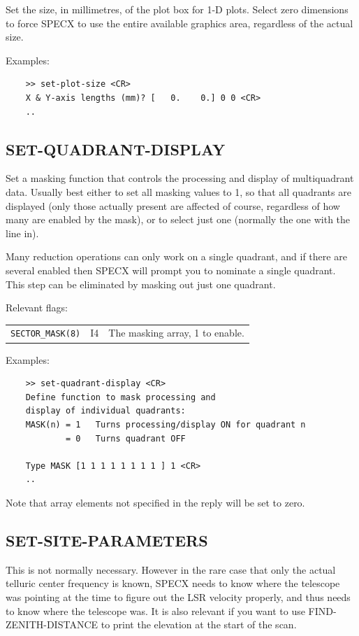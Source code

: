 \documentclass[11pt,twoside]{report}
\begin{document}
Set the size, in millimetres, of the plot box for 1-D plots. Select
zero dimensions to force SPECX to use the entire available graphics area,
regardless of the actual size.

Examples:
\begin{verbatim}
    >> set-plot-size <CR>
    X & Y-axis lengths (mm)? [   0.    0.] 0 0 <CR>
    ..
\end{verbatim}

\subsection{SET-QUADRANT-DISPLAY} 

Set a masking function that controls the processing and display of
multiquadrant data. Usually best either to set all masking values to 1,
so that all quadrants are displayed (only those actually present are
affected of course, regardless of how many are enabled by the mask), or
to select just one (normally the one with the line in). 

Many reduction operations can only work on a single quadrant, and if 
there are several enabled then SPECX will prompt you to nominate a
single quadrant. This step can be eliminated by masking out just one
quadrant.

Relevant flags:\\
\begin{tabular}{lll}
  \verb+SECTOR_MASK(8)+ & I4 & The masking array, 1 to enable.
\end{tabular}

Examples:
\begin{verbatim}
    >> set-quadrant-display <CR>
    Define function to mask processing and 
    display of individual quadrants:
    MASK(n) = 1   Turns processing/display ON for quadrant n
            = 0   Turns quadrant OFF

    Type MASK [1 1 1 1 1 1 1 1 ] 1 <CR>
    ..
\end{verbatim}
Note that array elements not specified in the reply will be set to zero.

\subsection{SET-SITE-PARAMETERS} 

This is not normally necessary. However in the rare case that only the
actual telluric center frequency is known, SPECX needs to know where the
telescope was pointing at the time to figure out the LSR velocity
properly, and thus needs to know where the telescope was. It is also
relevant if you want to use FIND-ZENITH-DISTANCE to print the elevation
at the start of the scan. 
\end{document}
